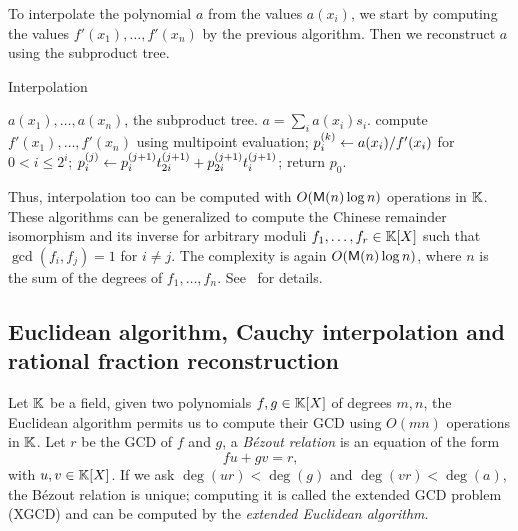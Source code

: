 To interpolate the polynomial $a$ from the values
$a(x_i)$, we start by computing the values $f'(x_1),
\ldots,\allowbreak f'(x_n)$ by the previous algorithm. Then we
reconstruct $a$ using the subproduct tree.

\begin{algorithm}
  \caption{\label{alg:interp}Interpolation}
  \begin{algorithmic}[1]
    \REQUIRE $a(x_1),\ldots,a(x_n)$, the subproduct tree.
    \ENSURE $a=\sum_i a(x_i)s_i$.
    \STATE compute $f'(x_1),\ldots,f'(x_n)$ using multipoint evaluation;
    \STATE $p_i^{(k)}\leftarrow a(x_i)/f'(x_i)$ for $0<i\le2^i$;
    \STATE $p_i^{(j)} \leftarrow p_i^{(j+1)}t_{2i}^{(j+1)} + p_{2i}^{(j+1)}t_{i}^{(j+1)}$;
    \ENDFOR
    \ENDFOR
    \STATE return $p_0$.
  \end{algorithmic}
\end{algorithm}

Thus, interpolation too can be computed with $O(\mathsf{M}(n)\log n)$
operations in $\mathbb{K}$. These algorithms can be generalized to compute the
Chinese remainder isomorphism and its inverse for arbitrary moduli
$f_1,\ldots,f_r\in\mathbb{K}[X]$ such that $\gcd(f_i,f_j)=1$ for $i\ne j$. The
complexity is again $O(\mathsf{M}(n)\log n)$, where $n$ is the sum of the
degrees of $f_1,\ldots,f_n$. See~\cite[$\S10$]{vzGG} for details.



\subsection[XGCD, Cauchy interpolation and RFR]{Euclidean algorithm,
  Cauchy interpolation and rational fraction reconstruction}
\label{sec:eucl-algor-rati}
Let $\mathbb{K}$ be a field, given two polynomials $f,g\in\mathbb{K}[X]$ of degrees
$m,n$, the Euclidean algorithm permits us to
compute their GCD using $O(mn)$ operations in $\mathbb{K}$. Let $r$
be the GCD of $f$ and $g$, a \emph{Bézout
  relation} is an equation of the form
\begin{equation}
  \label{eq:154}
  fu + gv = r
  \text{,}
\end{equation}
with $u,v\in\mathbb{K}[X]$. If we ask $\deg(ur)<\deg(g)$ and
$\deg(vr)<\deg(a)$, the Bézout relation is unique; computing it is
called the extended GCD problem (XGCD) and can be computed
by the \emph{extended Euclidean
  algorithm}.

